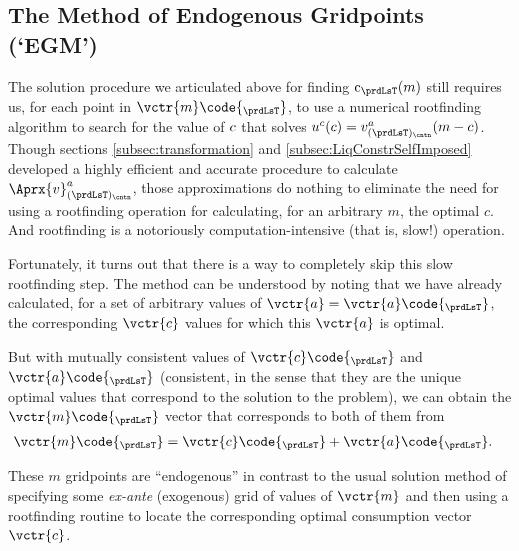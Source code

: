 \hypertarget{the-method-of-endogenous-gridpoints}{}
\subsection{The Method of Endogenous Gridpoints (`EGM')}\label{subsec:egm}

The solution procedure we articulated above for finding ${\cFunc}_{\prdLsT}({m})$ still requires us, for each point in $\vctr{{m}}\code{_{\prdLsT}}$, to use a numerical rootfinding algorithm to search for the value of $c$ that solves $\uFunc^{{c}}(\cNrm) = \vFunc^{{a}}_{({\prdLsT})_\cntn}({m}-\cNrm)$.  Though sections \ref{subsec:transformation} and \ref{subsec:LiqConstrSelfImposed} developed a highly efficient and accurate procedure to calculate $\Aprx{\vFunc}^{a}_{(\prdLsT)_\cntn}$, those approximations do nothing to eliminate the need for using a rootfinding operation for calculating, for an arbitrary ${m}$, the optimal ${c}$.  And rootfinding is a notoriously computation-intensive (that is, slow!) operation.

Fortunately, it turns out that there is a way to completely skip this slow rootfinding step.  The method can be understood by noting that we have already calculated, for a set of arbitrary values of $\vctr{a}=\vctr{{a}}\code{_{\prdLsT}}$, the corresponding $\vctr{c}$ values for which this $\vctr{a}$ is optimal.


But with mutually consistent values of $\vctr{{c}}\code{_{\prdLsT}}$ and $\vctr{{a}}\code{_{\prdLsT}}$ (consistent, in the sense that they are the unique optimal values that correspond to the solution to the problem), we can obtain the $\vctr{{m}}\code{_{\prdLsT}}$ vector that corresponds to both of them from
\begin{equation}\begin{gathered}\begin{aligned}
      \vctr{{m}}\code{_{\prdLsT}}  & = {\vctr{{\cNrm}}\code{_{\prdLsT}}+\vctr{{a}}\code{_{\prdLsT}}}.
    \end{aligned}\end{gathered}\end{equation}


These ${m}$ gridpoints are ``endogenous'' in contrast to the usual solution method of specifying some \textit{ex-ante} (exogenous) grid of values of $\vctr{m}$ and then using a rootfinding routine to locate the corresponding optimal consumption vector $\vctr{c}$.


